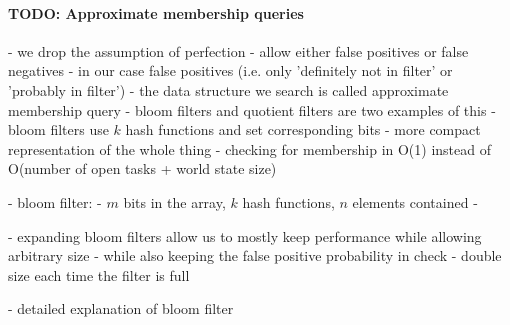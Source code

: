 \paragraph{TODO: Approximate membership queries}
- we drop the assumption of perfection
- allow either false positives or false negatives
- in our case false positives (i.e. only 'definitely not in filter' or 'probably in filter')
- the data structure we search is called approximate membership query
- bloom filters and quotient filters are two examples of this
- bloom filters use $k$ hash functions and set corresponding bits
- more compact representation of the whole thing
- checking for membership in O(1) instead of O(number of open tasks + world state size)

- bloom filter:
- $m$ bits in the array, $k$ hash functions, $n$ elements contained
- 

- expanding bloom filters allow us to mostly keep performance while allowing arbitrary size
- while also keeping the false positive probability in check
- double size each time the filter is full

- detailed explanation of bloom filter


